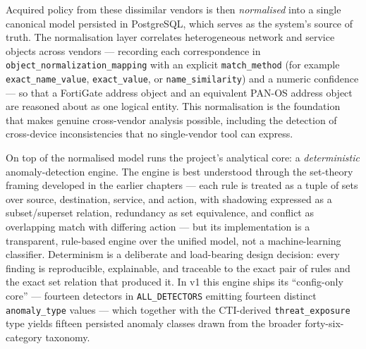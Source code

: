 Acquired policy from these dissimilar vendors is then \emph{normalised} into a single canonical model persisted in PostgreSQL, which serves as the system's source of truth. The normalisation layer correlates heterogeneous network and service objects across vendors --- recording each correspondence in \texttt{object\_normalization\_mapping} with an explicit \texttt{match\_method} (for example \texttt{exact\_name\_value}, \texttt{exact\_value}, or \texttt{name\_similarity}) and a numeric confidence --- so that a FortiGate address object and an equivalent PAN-OS address object are reasoned about as one logical entity. This normalisation is the foundation that makes genuine cross-vendor analysis possible, including the detection of cross-device inconsistencies that no single-vendor tool can express.

On top of the normalised model runs the project's analytical core: a \emph{deterministic} anomaly-detection engine. The engine is best understood through the set-theory framing developed in the earlier chapters --- each rule is treated as a tuple of sets over source, destination, service, and action, with shadowing expressed as a subset/superset relation, redundancy as set equivalence, and conflict as overlapping match with differing action --- but its implementation is a transparent, rule-based engine over the unified model, not a machine-learning classifier. Determinism is a deliberate and load-bearing design decision: every finding is reproducible, explainable, and traceable to the exact pair of rules and the exact set relation that produced it. In v1 this engine ships its ``config-only core'' --- fourteen detectors in \texttt{ALL\_DETECTORS} emitting fourteen distinct \texttt{anomaly\_type} values --- which together with the CTI-derived \texttt{threat\_exposure} type yields fifteen persisted anomaly classes drawn from the broader forty-six-category taxonomy.


